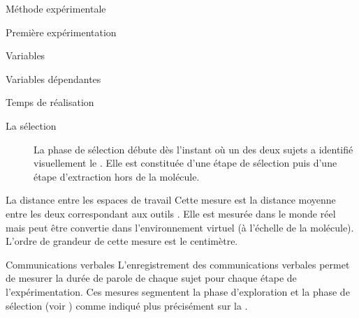 \documentclass[myfrancais,ngerman,english,french]{mythesis}
\begin{document}
\begin{mychapter}{Méthode expérimentale}
\begin{mysection}{Première expérimentation}
\begin{mysubsection}{Variables}
\begin{mysubsubsection}{Variables dépendantes}
\begin{myparagraph}{ Temps de réalisation}
\begin{description}
							\item[La sélection] La phase de sélection débute dès l'instant où un des deux sujets a identifié visuellement le .
								Elle est constituée d'une étape de sélection puis d'une étape d'extraction hors de la molécule.
						\end{description}
					\end{myparagraph}
					\begin{myparagraph}{ La distance entre les espaces de travail}
						Cette mesure est la distance moyenne entre les deux  correspondant aux outils .
						Elle est mesurée dans le monde réel mais peut être convertie dans l'environnement virtuel (à l'échelle de la molécule).
						L'ordre de grandeur de cette mesure est le centimètre.
					\end{myparagraph}
					\begin{myparagraph}{ Communications verbales}
						L'enregistrement des communications verbales permet de mesurer la durée de parole de chaque sujet pour chaque étape de l'expérimentation.
						Ces mesures segmentent la phase d'exploration et la phase de sélection (voir ) comme indiqué plus précisément sur la .


\end{myparagraph}
\end{mysubsubsection}
\end{mysubsection}
\end{mysection}
\end{mychapter}
\end{document}
